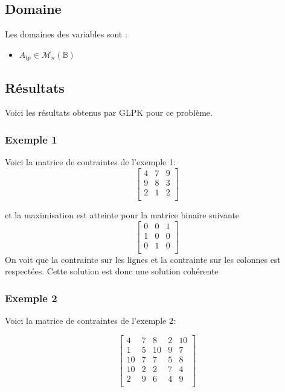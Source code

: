 \subsection{Domaine}
Les domaines des variables sont :
\begin{itemize}

\item $A_{tp} \in \mathcal{M}_n(\mathbb{B}) $

\end{itemize}

\subsection{Résultats}
Voici les résultats obtenus par GLPK pour ce problème.


\subsubsection{Exemple 1}
Voici la matrice de contraintes de l'exemple 1:
\[
\begin{bmatrix}
    4 & 7 & 9 \\
    9 & 8 & 3 \\
    2 & 1 & 2 \\
\end{bmatrix}
\]

et la maximisation est atteinte pour la matrice binaire suivante
\[
\begin{bmatrix}
    0 & 0 & 1 \\
    1 & 0 & 0 \\
    0 & 1 & 0 \\
\end{bmatrix}
\]
On voit que la contrainte sur les lignes et la contrainte sur les colonnes est respectées.
Cette solution est donc une solution cohérente

\subsubsection{Exemple 2}
Voici la matrice de contraintes de l'exemple 2:

\[
\begin{bmatrix}
    4 & 7 & 8 & 2 & 10 \\
    1 & 5 & 10 & 9 & 7 \\
    10 & 7 & 7 & 5 & 8 \\
    10 & 2 & 2 & 7 & 4 \\
    2 & 9 & 6 & 4 & 9 \\
\end{bmatrix}
\]


